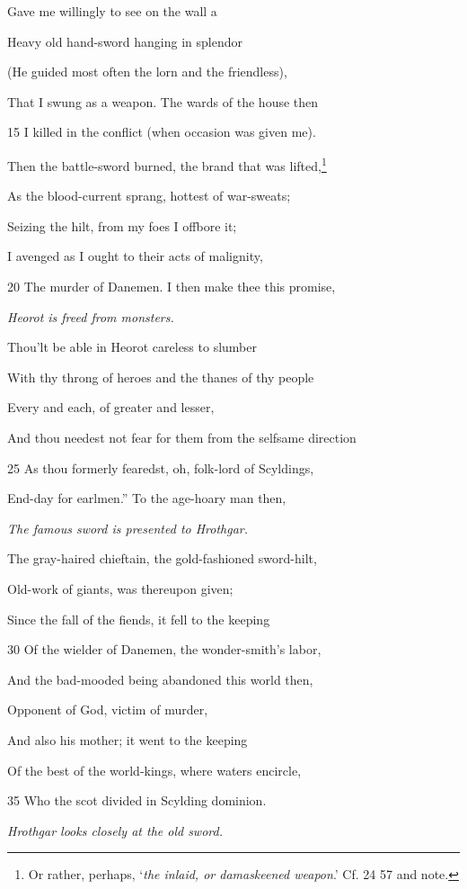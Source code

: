 Gave me willingly to see on the wall a

Heavy old hand-sword hanging in splendor

(He guided most often the lorn and the friendless),

That I swung as a weapon. The wards of the house then

15
I killed in the conflict (when occasion was given me).

Then the battle-sword burned, the brand that was lifted,\footnote{Or rather, perhaps, ‘\emph{the inlaid, or damaskeened weapon}.’ Cf. 24 57 and
note.}

As the blood-current sprang, hottest of war-sweats;

Seizing the hilt, from my foes I offbore it;

I avenged as I ought to their acts of malignity,

20
The murder of Danemen. I then make thee this promise,

\emph{Heorot is freed
from monsters.}

Thou’lt be able in Heorot careless to slumber

With thy throng of heroes and the thanes of thy people

Every and each, of greater and lesser,

And thou needest not fear for them from the selfsame direction

25
As thou formerly fearedst, oh, folk-lord of Scyldings,

End-day for earlmen.” To the age-hoary man then,

\emph{The famous sword
is presented to
Hrothgar.}

The gray-haired chieftain, the gold-fashioned sword-hilt,

Old-work of giants, was thereupon given;

Since the fall of the fiends, it fell to the keeping

30
Of the wielder of Danemen, the wonder-smith’s labor,

And the bad-mooded being abandoned this world then,

Opponent of God, victim of murder,

And also his mother; it went to the keeping

Of the best of the world-kings, where waters encircle,

35
Who the scot divided in Scylding dominion.

\emph{Hrothgar looks
closely at the old
sword.}

